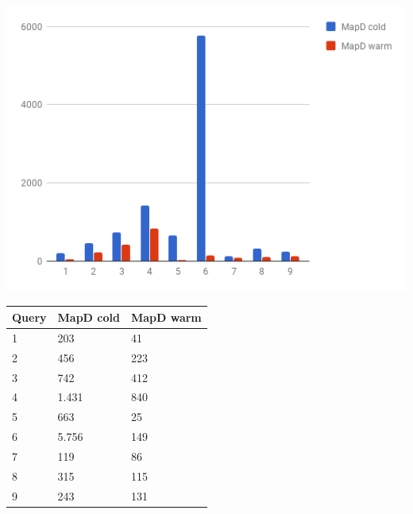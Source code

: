   \begin{minipage}{\textwidth}
  \begin{minipage}[b]{0.6\textwidth}
    \centering
     \includegraphics[width=1.0\textwidth,height=1.0\textheight,keepaspectratio]{images/mapd_cold_vs_warm.png}
    \label{fig:mapd_cold_vs_warm}
  \end{minipage}
  \hfill
  \begin{minipage}[b]{0.4\textwidth}
    \centering
  \begin{tabular}{ |l|p{2cm}|p{2cm}| }
    \hline
    Query & MapD cold & MapD warm \\
    \hline
    1 & 203 & 41 \\
    2 & 456 & 223 \\
    3 & 742 & 412 \\
    4 & 1.431 & 840 \\
    5 & 663 & 25 \\
    6 & 5.756 & 149 \\
    7 & 119 & 86 \\
    8 & 315 & 115 \\
    9 & 243 & 131 \\
    \hline
\end{tabular}
            \label{tab:mapd_cold_vs_warm}
    \end{minipage}
 \end{minipage}